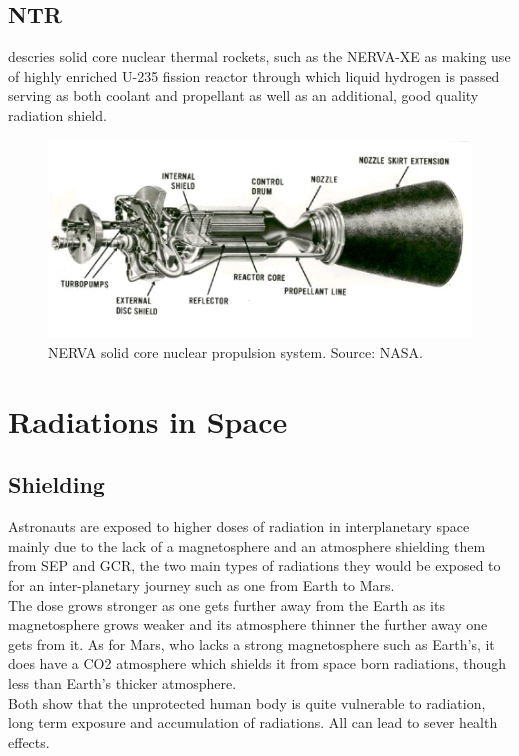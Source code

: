 \documentclass[12pt,a4paper]{report}
\begin{document}
\subsection{NTR}
\citet{finseth1991} descries solid core nuclear thermal rockets, such as the NERVA-XE as making use of highly enriched U-235 fission reactor through which liquid hydrogen is passed serving as both coolant and propellant as well as an additional, good quality radiation shield.
\begin{figure}[hbtp]
\centering
\includegraphics[scale=.7]{img/NERVA-solid-core-nuclear-propulsion-system.png}
\caption{NERVA solid core nuclear propulsion system. Source:
NASA.}
\end{figure}




\newpage

\section{Radiations in Space}


\subsection{Shielding}
Astronauts are exposed to higher doses of radiation in interplanetary space mainly due to the lack of a magnetosphere and an atmosphere shielding them from SEP and GCR, the two main types of radiations they would be exposed to for an inter-planetary journey such as one from Earth to Mars. \\
The dose grows stronger as one gets further away from the Earth as its magnetosphere grows weaker and its atmosphere thinner the further away one gets from it.
As for Mars, who lacks a strong magnetosphere such as Earth's, it does have a CO2 atmosphere which shields it from space born radiations, though less than Earth's thicker atmosphere.\\
Both \citet{baumstark2002life,cucinotta2009} show that the unprotected human body is quite vulnerable to radiation, long term exposure and accumulation of radiations. All can lead to sever health effects.\\
\end{document}
